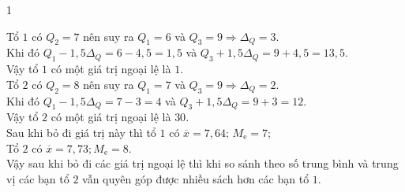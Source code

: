 \begin{bt}
{\begin{enumEX}[a)]{1}
			\item 
			Tổ $1$ có $Q_2=7$ nên suy ra $Q_1=6$ và $Q_3=9 \Rightarrow \Delta_Q=3$.\\
			Khi đó $Q_1-1{,}5\Delta_Q=6-4{,}5=1{,}5$ và $Q_3+1{,}5\Delta_Q=9+4{,}5=13{,}5$.\\
			Vậy tổ $1$ có một giá trị ngoại lệ là $1$.\\
			Tổ $2$ có $Q_2=8$ nên suy ra $Q_1=7$ và $Q_3=9 \Rightarrow \Delta_Q=2$.\\
			Khi đó $Q_1-1{,}5\Delta_Q=7-3=4$ và $Q_3+1{,}5\Delta_Q=9+3=12$.\\
			Vậy tổ $2$ có một giá trị ngoại lệ là $30$.\\
			Sau khi bỏ đi giá trị này thì tổ $1$ có $\overline{x}=7{,}64;\,M_\mathrm{e}=7$; \\
			Tổ $2$ có $\overline{x}=7{,}73;M_\mathrm{e}=8$.\\
			Vậy sau khi bỏ đi các giá trị ngoại lệ thì khi so sánh theo số trung bình và trung vị các bạn tổ $2$ vẫn quyên góp được nhiều sách hơn các bạn tổ $1$.
		\end{enumEX}
	}
\end{bt}

